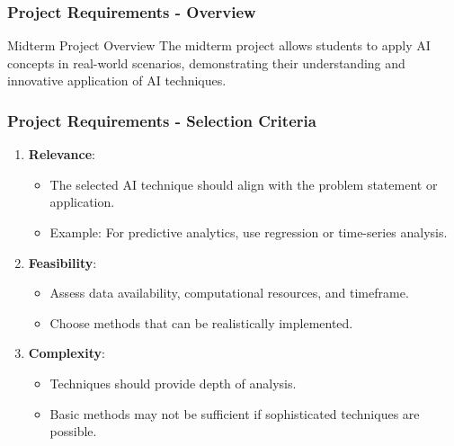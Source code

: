 \documentclass{beamer}
\begin{document}
\begin{frame}[fragile]
    \frametitle{Project Requirements - Overview}
    \begin{block}{Midterm Project Overview}
        The midterm project allows students to apply AI concepts in real-world scenarios, demonstrating their understanding and innovative application of AI techniques.
    \end{block}
\end{frame}

\begin{frame}[fragile]
    \frametitle{Project Requirements - Selection Criteria}
    \begin{enumerate}
        \item \textbf{Relevance}: 
        \begin{itemize}
            \item The selected AI technique should align with the problem statement or application.
            \item Example: For predictive analytics, use regression or time-series analysis.
        \end{itemize}
        
        \item \textbf{Feasibility}:
        \begin{itemize}
            \item Assess data availability, computational resources, and timeframe.
            \item Choose methods that can be realistically implemented.
        \end{itemize}

        \item \textbf{Complexity}:
        \begin{itemize}
            \item Techniques should provide depth of analysis.
            \item Basic methods may not be sufficient if sophisticated techniques are possible.
        \end{itemize}
    \end{enumerate}
\end{frame}
\end{document}
